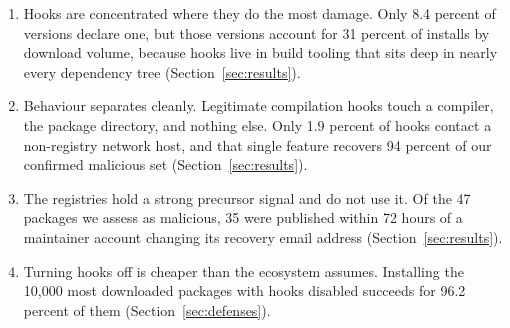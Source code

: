 \begin{enumerate}[leftmargin=*,itemsep=1pt,topsep=2pt]
  \item Hooks are concentrated where they do the most damage. Only 8.4 percent
        of versions declare one, but those versions account for 31 percent of
        installs by download volume, because hooks live in build tooling that
        sits deep in nearly every dependency tree
        (Section~\ref{sec:results}).
  \item Behaviour separates cleanly. Legitimate compilation hooks touch a
        compiler, the package directory, and nothing else. Only 1.9 percent of
        hooks contact a non-registry network host, and that single feature
        recovers 94 percent of our confirmed malicious set
        (Section~\ref{sec:results}).
  \item The registries hold a strong precursor signal and do not use it. Of
        the 47 packages we assess as malicious, 35 were published within 72
        hours of a maintainer account changing its recovery email address
        (Section~\ref{sec:results}).
  \item Turning hooks off is cheaper than the ecosystem assumes. Installing the
        10{,}000 most downloaded packages with hooks disabled succeeds for 96.2
        percent of them (Section~\ref{sec:defenses}).
\end{enumerate}
